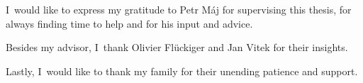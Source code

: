 I~would like to express my gratitude to Petr Máj for supervising this thesis, for always finding time to help and for his input and advice.

Besides my advisor, I~thank Olivier Flückiger and Jan Vitek for their insights.

Lastly, I~would like to thank my family for their unending patience and support.
